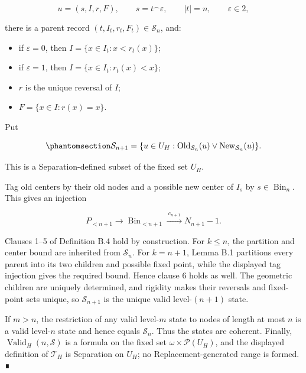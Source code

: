 \documentclass[
  english,
  11pt,
  reqno]{amsart}
\providecommand{\tightlist}{%
  \setlength{\itemsep}{0pt}\setlength{\parskip}{0pt}}
\begin{document}
\[
u=(s,I,r,F),
\qquad
s=t^\frown\varepsilon,
\qquad
|t|=n,
\qquad
\varepsilon\in2,
\]

there is a parent record \((t,I_t,r_t,F_t)\in\mathcal S_n\), and:

\begin{itemize}
\tightlist
\item
  if \(\varepsilon=0\), then \(I=\{x\in I_t:x<r_t(x)\}\);
\item
  if \(\varepsilon=1\), then \(I=\{x\in I_t:r_t(x)<x\}\);
\item
  \(r\) is the unique reversal of \(I\);
\item
  \(F=\{x\in I:r(x)=x\}\).
\end{itemize}

Put

\begin{equation}\protect\phantomsection\label{eq:typefree-successor-state}{
\mathcal S_{n+1}
=
\{u\in U_H:
\operatorname{Old}_{\mathcal S_n}(u)
\vee
\operatorname{New}_{\mathcal S_n}(u)\}.
}\end{equation}

This is a Separation-defined subset of the fixed set \(U_H\).

Tag old centers by their old nodes and a possible new center of \(I_s\)
by \(s\in\operatorname{Bin}_n\). This gives an injection

\[
P_{<n+1}\longrightarrow\operatorname{Bin}_{<n+1}\xrightarrow{\ c_{n+1}\ }N_{n+1}-1.
\]

Clauses 1--5 of Definition B.4 hold by construction. For \(k\le n\), the
partition and center bound are inherited from \(\mathcal S_n\). For
\(k=n+1\), Lemma B.1 partitions every parent into its two children and
possible fixed point, while the displayed tag injection gives the
required bound. Hence clause 6 holds as well. The geometric children are
uniquely determined, and rigidity makes their reversals and fixed-point
sets unique, so \(\mathcal S_{n+1}\) is the unique valid level-\((n+1)\)
state.

If \(m>n\), the restriction of any valid level-\(m\) state to nodes of
length at most \(n\) is a valid level-\(n\) state and hence equals
\(\mathcal S_n\). Thus the states are coherent. Finally,
\(\operatorname{Valid}_H(n,\mathcal S)\) is a formula on the fixed set
\(\omega\times\mathcal P(U_H)\), and the displayed definition of
\(\mathcal T_H\) is Separation on \(U_H\); no Replacement-generated
range is formed. ∎

\protect{}\label{lem:b-6-center-countability}
\end{document}
